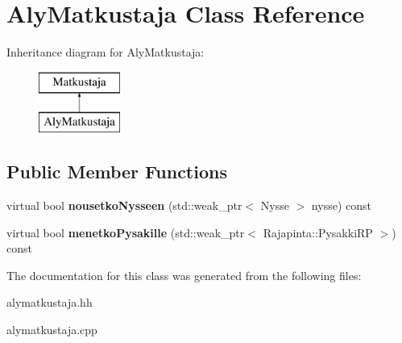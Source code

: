 \hypertarget{class_aly_matkustaja}{\section{Aly\-Matkustaja Class Reference}
\label{class_aly_matkustaja}
}
Inheritance diagram for Aly\-Matkustaja\-:\begin{figure}[H]
\begin{center}
\leavevmode
\includegraphics[height=2.000000cm]{class_aly_matkustaja}
\end{center}
\end{figure}
\subsection*{Public Member Functions}
\begin{DoxyCompactItemize}
\item 
\hypertarget{class_aly_matkustaja_a43c65df80fbb8f6a08cc64c53e937622}{virtual bool {\bfseries nousetko\-Nysseen} (std\-::weak\-\_\-ptr$<$ Nysse $>$ nysse) const }\label{class_aly_matkustaja_a43c65df80fbb8f6a08cc64c53e937622}

\item 
\hypertarget{class_aly_matkustaja_a7089b633bb040563f281310824b8ca77}{virtual bool {\bfseries menetko\-Pysakille} (std\-::weak\-\_\-ptr$<$ Rajapinta\-::\-Pysakki\-R\-P $>$) const }\label{class_aly_matkustaja_a7089b633bb040563f281310824b8ca77}

\end{DoxyCompactItemize}


The documentation for this class was generated from the following files\-:\begin{DoxyCompactItemize}
\item 
alymatkustaja.\-hh\item 
alymatkustaja.\-cpp\end{DoxyCompactItemize}
